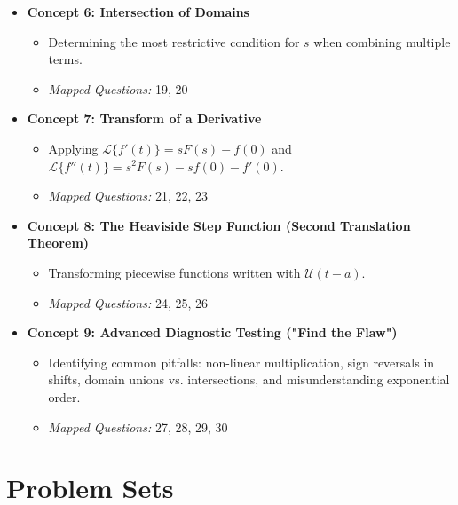 \documentclass[11pt, letterpaper]{article}
\theoremstyle{definition}
\theoremstyle{remark}
\begin{document}
\begin{itemize}
    \item \textbf{Concept 6: Intersection of Domains}
    \begin{itemize}
        \item Determining the most restrictive condition for $s$ when combining multiple terms.
        \item \textit{Mapped Questions:} 19, 20
    \end{itemize}
    
    \item \textbf{Concept 7: Transform of a Derivative}
    \begin{itemize}
        \item Applying $\mathscr{L}\{f'(t)\} = sF(s) - f(0)$ and $\mathscr{L}\{f''(t)\} = s^2F(s) - sf(0) - f'(0)$.
        \item \textit{Mapped Questions:} 21, 22, 23
    \end{itemize}
    
    \item \textbf{Concept 8: The Heaviside Step Function (Second Translation Theorem)}
    \begin{itemize}
        \item Transforming piecewise functions written with $\mathcal{U}(t-a)$.
        \item \textit{Mapped Questions:} 24, 25, 26
    \end{itemize}
    
    \item \textbf{Concept 9: Advanced Diagnostic Testing ("Find the Flaw")}
    \begin{itemize}
        \item Identifying common pitfalls: non-linear multiplication, sign reversals in shifts, domain unions vs. intersections, and misunderstanding exponential order.
        \item \textit{Mapped Questions:} 27, 28, 29, 30
    \end{itemize}
\end{itemize}

\newpage

\section{Problem Sets}
\end{document}

